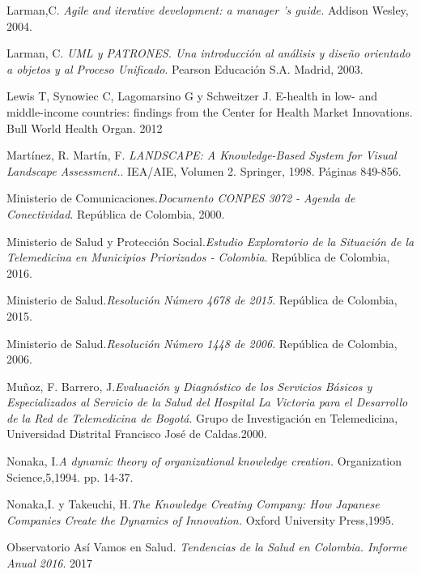 \begin{thebibliography}{}
 Larman,C. \textit{Agile and iterative development: a manager ’s guide.} Addison Wesley, 2004.

 Larman, C. \textit{UML y PATRONES. Una introducción al análisis y diseño orientado a objetos y al Proceso Unificado}. Pearson Educación S.A. Madrid, 2003.

 Lewis T, Synowiec C, Lagomarsino G y Schweitzer J. E-health in low- and middle-income countries: findings from the Center for Health Market Innovations. Bull World Health Organ. 2012

 Martínez, R. Martín, F. \textit{LANDSCAPE: A Knowledge-Based System for Visual Landscape Assessment.}. IEA/AIE, Volumen 2. Springer, 1998. Páginas 849-856.

 Ministerio de Comunicaciones.\textit{Documento CONPES 3072 - Agenda de Conectividad}. República de Colombia, 2000.

 Ministerio de Salud y Protección Social.\textit{Estudio Exploratorio de la Situación de la Telemedicina en Municipios Priorizados - Colombia}. República de Colombia, 2016.

 Ministerio de Salud.\textit{Resolución Número 4678 de 2015}. República de Colombia, 2015.

 Ministerio de Salud.\textit{Resolución Número 1448 de 2006}. República de Colombia, 2006.

 Muñoz, F. Barrero, J.\textit{Evaluación y Diagnóstico de los Servicios Básicos y Especializados al Servicio de la Salud del Hospital La Victoria para el Desarrollo de la Red de Telemedicina de Bogotá}. Grupo de Investigación en Telemedicina,  Universidad Distrital Francisco José de Caldas.2000.

 Nonaka, I.\textit{A dynamic theory of organizational knowledge creation.} Organization Science,5,1994. pp. 14-37.

 Nonaka,I. y Takeuchi, H.\textit{The Knowledge Creating Company: How Japanese Companies Create the Dynamics of Innovation.} Oxford University Press,1995.

 Observatorio Así Vamos en Salud. \textit{Tendencias de la Salud en Colombia. Informe Anual 2016}. 2017


\end{thebibliography}
